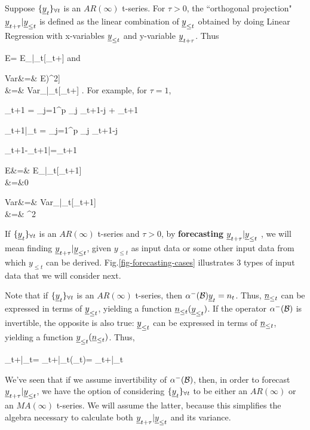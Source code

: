 Suppose 
${\{{\underline{y}}_t\}_{\forall t}}$
is an $AR(\infty)$ t-series. For $\tau>0$,
the ``orthogonal projection" 
${\underline{y}}_{t+\tau}|{\underline{y}}_{\leq t}$
is defined as the 
linear combination of ${\underline{y}}_{\leq t}$
obtained by doing
Linear Regression
with x-variables
${\underline{y}}_{\leq t}$
and y-variable
${\underline{y}}_{t+\tau}$. Thus

\beq
E
=
E_{|\rvy_{\leq t}}[\rvy_{t+\tau}]
\eeq
and

\beqa
Var&=&
E\left[
\left(\rvy_{t+\tau}|\rvy_{\leq t}
-E[\rvy_{t+\tau}|\rvy_{\leq t}]
\right)^2\right]
\\
&=&
Var_{|\rvy_{\leq t}}[\rvy_{t+\tau}]
\;.
\eeqa
For example, for $\tau=1$,


\beq 
\rvy_{t+1} = \sum_{j=1}^p \alp_j \rvy_{t+1-j}
+ \rvn_{t+1}
\eeq

\beq 
\rvy_{t+1}|\rvy_{\leq t} = 
\sum_{j=1}^p \alp_j \rvy_{t+1-j}
\eeq

\beq
\rvy_{t+1}-\rvy_{t+1|}=\rvn_{t+1}
\eeq

\beqa
E&=&
E_{|\rvy_{\leq t}}[\rvy_{t+1}]
\\
&=&0
\eeqa

\beqa
Var
&=&
Var_{|\rvy_{\leq t}}[\rvy_{t+1}]
\\
&=& \s^2
\eeqa

If ${\{{\underline{y}}_t\}_{\forall t}}$
is an $AR(\infty)$
t-series and $\tau>0$, 
by {\bf forecasting} ${\underline{y}}_{t+\tau}|{\underline{y}}_{\leq t}$ ,
we will mean
finding ${\underline{y}}_{t+\tau}|{\underline{y}}_{\leq t}$,
given
$y_{\leq t}$
as input data
or some other input data
from which $y_{\leq t}$
can be derived.
Fig.\ref{fig-forecasting-cases}
illustrates 3 types 
of input 
data that we will consider
next.



Note that if ${\{{\underline{y}}_t\}_{\forall t}}$
is an $AR(\infty)$
t-series, 
then $\alpha^-({\cal B}){\underline{y}}_t=n_t$.
Thus, ${\underline{n}}_{\leq t}$
can be expressed in terms 
of ${\underline{y}}_{\leq t}$,
yielding a function 
${\underline{n}}_{\leq t}({\underline{y}}_{\leq t})$.
If the operator
$\alpha^-({\cal B})$
is invertible,
the opposite is also true: ${\underline{y}}_{\leq t}$
can be expressed in terms
of ${\underline{n}}_{\leq t}$,
yielding a function 
${\underline{y}}_{\leq t}({\underline{n}}_{\leq t})$.
Thus, 

\beq
\rvy_{t+\tau}|\rvy_{\leq t}=
\rvy_{t+\tau}|\rvy_{\leq t}(\rvn_{\leq t})=
\rvy_{t+\tau}|\rvn_{\leq t}
\eeq

We've
seen that
 if we 
assume invertibility
of $\alpha^-({\cal B})$, then,
in order 
to forecast ${\underline{y}}_{t+\tau}|{\underline{y}}_{\leq t}$,
we have the option
of considering ${\{{\underline{y}}_t\}_{\forall t}}$ to be
either an $AR(\infty)$
or an $MA(\infty)$
t-series. We will assume
the latter,
because this
simplifies 
the algebra
necessary to calculate
both
${\underline{y}}_{t+\tau}|{\underline{y}}_{\leq t}$
and its 
variance.


